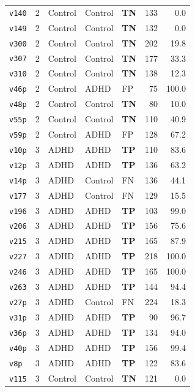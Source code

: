 \begin{longtable}{lclllrr}
  \texttt{v140} & 2 & Control & Control & \textbf{TN} & 133 & 0.0 \\
  \texttt{v149} & 2 & Control & Control & \textbf{TN} & 132 & 0.0 \\
  \texttt{v300} & 2 & Control & Control & \textbf{TN} & 202 & 19.8 \\
  \texttt{v307} & 2 & Control & Control & \textbf{TN} & 177 & 33.3 \\
  \texttt{v310} & 2 & Control & Control & \textbf{TN} & 138 & 12.3 \\
  \texttt{v46p} & 2 & Control & ADHD & FP & 75 & 100.0 \\
  \texttt{v48p} & 2 & Control & Control & \textbf{TN} & 80 & 10.0 \\
  \texttt{v55p} & 2 & Control & Control & \textbf{TN} & 110 & 40.9 \\
  \texttt{v59p} & 2 & Control & ADHD & FP & 128 & 67.2 \\
  \midrule
  \texttt{v10p} & 3 & ADHD & ADHD & \textbf{TP} & 110 & 83.6 \\
  \texttt{v12p} & 3 & ADHD & ADHD & \textbf{TP} & 136 & 63.2 \\
  \texttt{v14p} & 3 & ADHD & Control & FN & 136 & 44.1 \\
  \texttt{v177} & 3 & ADHD & Control & FN & 129 & 15.5 \\
  \texttt{v196} & 3 & ADHD & ADHD & \textbf{TP} & 103 & 99.0 \\
  \texttt{v206} & 3 & ADHD & ADHD & \textbf{TP} & 156 & 75.6 \\
  \texttt{v215} & 3 & ADHD & ADHD & \textbf{TP} & 165 & 87.9 \\
  \texttt{v227} & 3 & ADHD & ADHD & \textbf{TP} & 218 & 100.0 \\
  \texttt{v246} & 3 & ADHD & ADHD & \textbf{TP} & 165 & 100.0 \\
  \texttt{v263} & 3 & ADHD & ADHD & \textbf{TP} & 144 & 94.4 \\
  \texttt{v27p} & 3 & ADHD & Control & FN & 224 & 18.3 \\
  \texttt{v31p} & 3 & ADHD & ADHD & \textbf{TP} & 90 & 96.7 \\
  \texttt{v36p} & 3 & ADHD & ADHD & \textbf{TP} & 134 & 94.0 \\
  \texttt{v40p} & 3 & ADHD & ADHD & \textbf{TP} & 156 & 99.4 \\
  \texttt{v8p} & 3 & ADHD & ADHD & \textbf{TP} & 122 & 83.6 \\
  \texttt{v115} & 3 & Control & Control & \textbf{TN} & 121 & 0.0 \\

\end{longtable}
